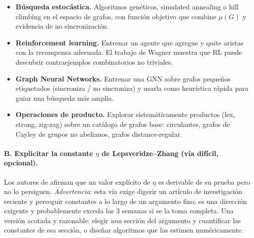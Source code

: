 \documentclass[11pt,a4paper]{article}
\begin{document}
\begin{itemize}
    \emph{Dos advertencias.} Primero, antes de comprometerse con un rango de $n$, estimar el tamaño de la búsqueda con \texttt{geng -u} (que sólo cuenta): la cantidad de clases de isomorfismo crece ferozmente y para $n=14,15$ puede resultar inviable en computadoras personales. Segundo, los mínimos no sincronizados conocidos son esencialmente estados twisted, que necesitan suficiente ``circunferencia'' para enrollarse; con $n\le 15$ y grado mínimo $\ge 0{.}69\,n$ es muy plausible que no existan contraejemplos, y el resultado esperable de esta vía es \emph{negativo}. Ese resultado negativo, bien documentado, vale por sí mismo, y el pipeline construido se reutiliza directamente en las vías estocásticas sobre $n$ grandes, donde sí hay esperanza de encontrar algo nuevo.
    \item \textbf{Búsqueda estocástica.} Algoritmos genéticos, simulated annealing o hill climbing en el espacio de grafos, con función objetivo que combine $\mu(G)$ y evidencia de no sincronización.
    \item \textbf{Reinforcement learning.} Entrenar un agente que agregue y quite aristas con la recompensa adecuada. El trabajo de Wagner \cite{wagner2021} muestra que RL puede descubrir contraejemplos combinatorios no triviales.
    \item \textbf{Graph Neural Networks.} Entrenar una GNN sobre grafos pequeños etiquetados (sincroniza / no sincroniza) y usarla como heurística rápida para guiar una búsqueda más amplia.
    \item \textbf{Operaciones de producto.} Explorar sistemáticamente productos (lex, strong, zig-zag) sobre un catálogo de grafos base: circulantes, grafos de Cayley de grupos no abelianos, grafos distance-regular.
\end{itemize}

\paragraph{B. Explicitar la constante $\eta$ de Lepsveridze–Zhang (vía difícil, opcional).}
Los autores de \cite{lepsveridze-zhang} afirman que un valor explícito de $\eta$ es derivable de su prueba pero no lo persiguen. \emph{Advertencia}: esta vía exige digerir un artículo de investigación reciente y perseguir constantes a lo largo de un argumento fino; es una dirección exigente y probablemente exceda las 3 semanas si se la toma completa. Una versión acotada y razonable: elegir \emph{una} sección del argumento y cuantificar las constantes de esa sección, o diseñar algoritmos que las estimen numéricamente.
\end{document}
